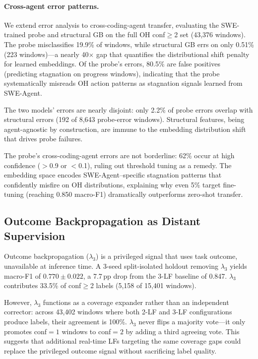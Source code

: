 \paragraph{Cross-agent error patterns.}
We extend error analysis to cross-coding-agent transfer, evaluating the SWE-trained probe and structural GB on the full OH conf${\geq}$2 set (43,376 windows).
The probe misclassifies 19.9\% of windows, while structural GB errs on only 0.51\% (223 windows)---a nearly 40$\times$ gap that quantifies the distributional shift penalty for learned embeddings.
Of the probe's errors, 80.5\% are false positives (predicting stagnation on progress windows), indicating that the probe systematically misreads OH action patterns as stagnation signals learned from SWE-Agent.

The two models' errors are nearly disjoint: only 2.2\% of probe errors overlap with structural errors (192 of 8,643 probe-error windows).
Structural features, being agent-agnostic by construction, are immune to the embedding distribution shift that drives probe failures.

The probe's cross-coding-agent errors are not borderline: 62\% occur at high confidence ($>$0.9 or $<$0.1), ruling out threshold tuning as a remedy.
The embedding space encodes SWE-Agent--specific stagnation patterns that confidently misfire on OH distributions, explaining why even 5\% target fine-tuning (reaching 0.850 macro-F1) dramatically outperforms zero-shot transfer.

\subsection{Outcome Backpropagation as Distant Supervision}
\label{sec:app_ob_analysis}

Outcome backpropagation ($\lambda_3$) is a privileged signal that uses task outcome, unavailable at inference time.
A 3-seed split-isolated holdout removing $\lambda_3$ yields macro-F1 of $0.770{\pm}0.022$, a 7.7\,pp drop from the 3-LF baseline of 0.847.
$\lambda_3$ contributes 33.5\% of conf${\geq}$2 labels (5,158 of 15,401 windows).

However, $\lambda_3$ functions as a coverage expander rather than an independent corrector: across 43,402 windows where both 2-LF and 3-LF configurations produce labels, their agreement is 100\%.
$\lambda_3$ never flips a majority vote---it only promotes conf${=}1$ windows to conf${=}2$ by adding a third agreeing vote.
This suggests that additional real-time LFs targeting the same coverage gaps could replace the privileged outcome signal without sacrificing label quality.

